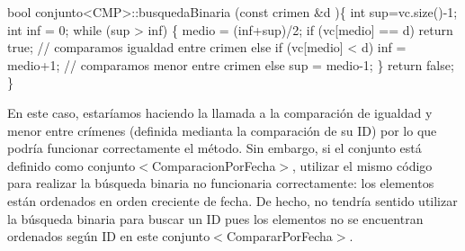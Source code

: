 \begin{DoxyCode}
\textcolor{keywordtype}{bool} conjunto<CMP>::busquedaBinaria (\textcolor{keyword}{const} crimen &d )\{
    \textcolor{keywordtype}{int} sup=vc.size()-1;
    \textcolor{keywordtype}{int} inf = 0;
    \textcolor{keywordflow}{while} (sup > inf) \{
      medio = (inf+sup)/2;
      \textcolor{keywordflow}{if} (vc[medio] == d) \textcolor{keywordflow}{return} \textcolor{keyword}{true};  \textcolor{comment}{// comparamos igualdad entre crimen}
      \textcolor{keywordflow}{else} \textcolor{keywordflow}{if} (vc[medio] < d) inf = medio+1; \textcolor{comment}{// comparamos menor entre crimen}
      \textcolor{keywordflow}{else} sup = medio-1;
    \}
    \textcolor{keywordflow}{return} \textcolor{keyword}{false};
\}
\end{DoxyCode}
 En este caso, estaríamos haciendo la llamada a la comparación de igualdad y menor entre crímenes (definida medianta la comparación de su I\+D) por lo que podría funcionar correctamente el método. Sin embargo, si el conjunto está definido como conjunto$<$\+Comparacion\+Por\+Fecha$>$, utilizar el mismo código para realizar la búsqueda binaria no funcionaria correctamente\+: los elementos están ordenados en orden creciente de fecha. De hecho, no tendría sentido utilizar la búsqueda binaria para buscar un I\+D pues los elementos no se encuentran ordenados según I\+D en este conjunto$<$\+Comparar\+Por\+Fecha$>$.

